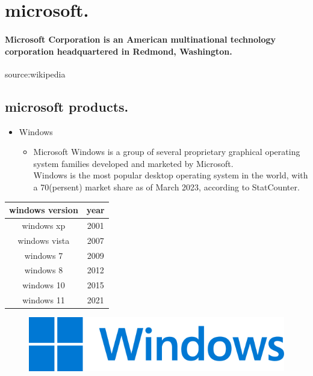 \documentclass[a4paper,11pt]{report}
\begin{document}
\section{microsoft.}

    \paragraph{Microsoft Corporation is an American multinational technology corporation headquartered in Redmond, Washington.}source:wikipedia

\subsection{microsoft products.}
\begin{itemize}
    \item Windows
    \begin{itemize}
         \item Microsoft Windows is a group of several proprietary graphical operating system families developed and marketed by Microsoft.\\
         Windows is the most popular desktop operating system in the world, with a 70(persent) market share as of March 2023, according to StatCounter.
\end{itemize}
\end{itemize}

\begin{center}
    

\begin{tabular}{|c|c|}
\hline
   windows version  & year   \\ 
   \hline
    windows xp &2001 \\
     \hline
   windows vista &2007 \\
     \hline
    windows 7&2009 \\
     \hline
    windows 8&2012  \\
     \hline
   windows  10&2015 \\
    \hline
   windows 11&2021  \\
    \hline
\end{tabular}
\end{center}
\begin{figure}[!h]
    \centering
    \includegraphics[scale=0.4]{img7.png}
    
    
\end{figure}
\end{document}

